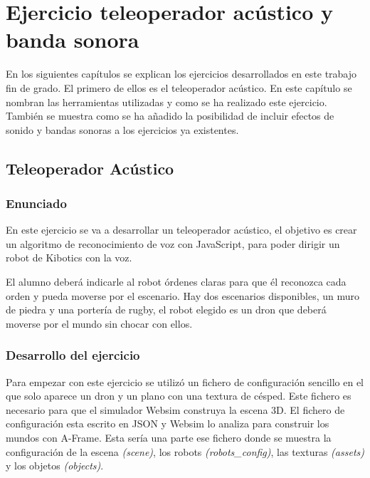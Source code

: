 \chapter{Ejercicio teleoperador acústico y banda sonora}\label{audio}
En los siguientes capítulos se explican los ejercicios desarrollados en este trabajo fin de grado. El primero de ellos es el teleoperador acústico. En este capítulo se nombran las herramientas utilizadas y como se ha realizado este ejercicio. También se muestra como se ha añadido la posibilidad de incluir efectos de sonido y bandas sonoras a los ejercicios ya existentes. 

\section{Teleoperador Acústico}
\subsection{Enunciado}
En este ejercicio se va a desarrollar un teleoperador acústico, el objetivo es crear un algoritmo de reconocimiento de voz con JavaScript, para poder dirigir un robot de Kibotics con la voz. 

El alumno deberá indicarle  al robot órdenes claras para que él reconozca cada orden  y pueda moverse por el escenario. Hay dos escenarios disponibles, un muro de piedra y una portería de rugby, el robot elegido es un dron que deberá moverse por el mundo sin chocar con ellos.

\subsection{Desarrollo del ejercicio}

Para empezar con este ejercicio se utilizó un fichero de configuración sencillo en el que solo aparece un dron y un plano con una textura de césped. Este fichero es necesario para que el simulador Websim construya la escena 3D. El fichero de configuración esta escrito en JSON y Websim lo analiza para construir los mundos con A-Frame. 
Esta sería una parte ese fichero donde se muestra la configuración de la escena \textit{(scene)}, los robots \textit {(robots\_config)}, las texturas \textit{(assets)} y los objetos \textit{(objects)}.

